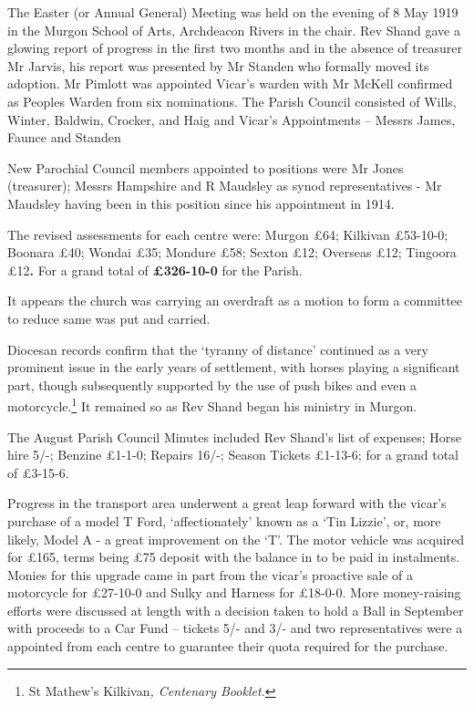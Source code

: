 The Easter (or Annual General) Meeting was held on the evening of 8 May 1919 in the Murgon School of Arts, Archdeacon Rivers in the chair. Rev Shand gave a glowing report of progress in the first two months and in the absence of treasurer Mr Jarvis, his report was presented by Mr Standen who formally moved its adoption. Mr Pimlott was appointed Vicar's warden with Mr McKell confirmed as Peoples Warden from six nominations. The Parish Council consisted of Wills, Winter, Baldwin, Crocker, and Haig and Vicar's Appointments -- Messrs James, Faunce and Standen

New Parochial Council members appointed to positions were Mr Jones (treasurer); Messrs Hampshire and R Maudsley as synod representatives - Mr Maudsley having been in this position since his appointment in 1914.

The revised assessments for each centre were: Murgon £64; Kilkivan £53-10-0; Boonara £40; Wondai £35; Mondure £58; Sexton £12; Overseas £12; Tingoora £12\textbf{.} For a grand total of \textbf{£326-10-0} for the Parish.

It appears the church was carrying an overdraft as a motion to form a committee to reduce same was put and carried.

Diocesan records confirm that the `tyranny of distance' continued as a very prominent issue in the early years of settlement, with horses playing a significant part, though subsequently supported by the use of push bikes and even a motorcycle.\footnote{St Mathew's Kilkivan\emph{, Centenary Booklet.}} It remained so as Rev Shand began his ministry in Murgon.

The August Parish Council Minutes included Rev Shand's list of expenses; Horse hire 5/-; Benzine £1-1-0; Repairs 16/-; Season Tickets £1-13-6; for a grand total of £3-15-6.

Progress in the transport area underwent a great leap forward with the vicar's purchase of a model T Ford, `affectionately' known as a `Tin Lizzie', or, more likely, Model A - a great improvement on the `T'. The motor vehicle was acquired for £165, terms being £75 deposit with the balance in to be paid in instalments. Monies for this upgrade came in part from the vicar's proactive sale of a motorcycle for £27-10-0 and Sulky and Harness for £18-0-0. More money-raising efforts were discussed at length with a decision taken to hold a Ball in September with proceeds to a Car Fund -- tickets 5/- and 3/- and two representatives were a appointed from each centre to guarantee their quota required for the purchase.

